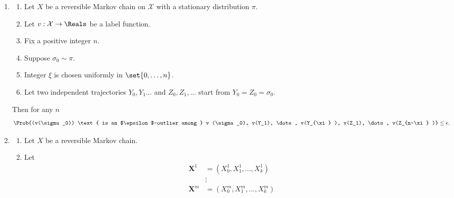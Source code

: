\documentclass[12pt]{article}
\begin{document}
\begin{enumerate}
\begin{theorem}
        \end{theorem}
    \item
        \begin{theorem}
            \label{thm:parallelsignificance:bc1}
            \begin{enumerate}
                \item
                    Let \( X \) be a reversible Markov chain on \(
                    \mathcal{X} \) with a stationary distribution \( \pi
                    \).
                \item
                    Let \( v :  \mathcal{X} \to \Reals \) be a label
                    function.
                \item
                    Fix a positive integer \( n \).
                \item
                    Suppose \( \sigma_0 \sim \pi \).
                \item
                    Integer \( \xi \) is chosen uniformly in \( \set{0,\dots,
                    n} \).
                \item
                    Let two independent trajectories \( Y_0 , Y_1 \dots \)
                    and \( Z_0, Z_1, \dots \) start from \( Y_0 = Z_0 =
                    \sigma_0 \).
            \end{enumerate}
            Then for any \( n \)
            \[
                \Prob{(v(\sigma_0)) \text{ is an $\epsilon$-outlier
                among } v (\sigma_0), v(Y_1), \dots, v(Y_{\xi} ), v(Z_1),
                \dots, v(Z_{n-\xi} )} \le \epsilon.
            \]
        \end{theorem}
    \item
        \begin{theorem}
            \label{thm:parallelsignificance:thm3point1}
            \begin{enumerate}
                \item
                    Let \( X \) be a reversible Markov chain.
                \item
                    Let
                    \begin{align*}
                        \mathbf{X}^1 &= (X_0^1, X_1^1, \dots, X_k^1 )\\
                        &\vdots \\
                        \mathbf{X}^m &= (X_0^m, X_1^m, \dots, X_k^m )\\
                    \end{align*}

\end{enumerate}
\end{theorem}
\end{enumerate}
\end{document}
